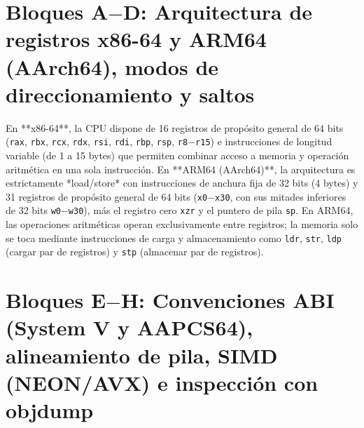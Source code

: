 \documentclass{book}
\begin{document}
\section{Bloques A\(-\)D: Arquitectura de registros x86-64 y ARM64 (AArch64), modos de direccionamiento y saltos}

En **x86-64**, la CPU dispone de 16 registros de propósito general de 64 bits (\texttt{rax}, \texttt{rbx}, \texttt{rcx}, \texttt{rdx}, \texttt{rsi}, \texttt{rdi}, \texttt{rbp}, \texttt{rsp}, \texttt{r8}\(-\)\texttt{r15}) e instrucciones de longitud variable (de 1 a 15 bytes) que permiten combinar acceso a memoria y operación aritmética en una sola instrucción. En **ARM64 (AArch64)**, la arquitectura es estrictamente *load/store* con instrucciones de anchura fija de 32 bits (4 bytes) y 31 registros de propósito general de 64 bits (\texttt{x0}\(-\)\texttt{x30}, con sus mitades inferiores de 32 bits \texttt{w0}\(-\)\texttt{w30}), más el registro cero \texttt{xzr} y el puntero de pila \texttt{sp}. En ARM64, las operaciones aritméticas operan exclusivamente entre registros; la memoria solo se toca mediante instrucciones de carga y almacenamiento como \texttt{ldr}, \texttt{str}, \texttt{ldp} (cargar par de registros) y \texttt{stp} (almacenar par de registros).

\section{Bloques E\(-\)H: Convenciones ABI (System V y AAPCS64), alineamiento de pila, SIMD (NEON/AVX) e inspección con objdump}
\end{document}
